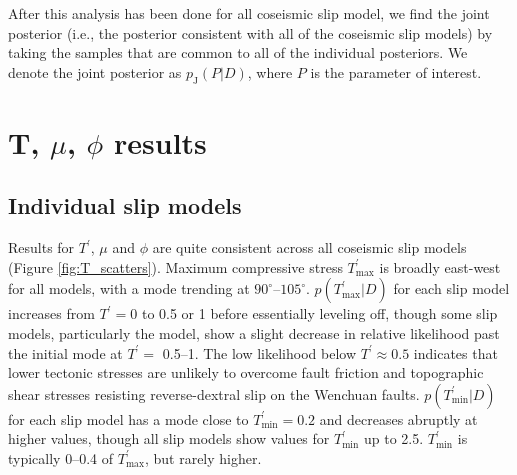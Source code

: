 \documentclass[twocolumn,jgrga]{AGUTeX}
\begin{document}
\begin{article}
After this analysis has been done for all coseismic slip model, we find
the joint posterior (i.e., the posterior consistent with all of the
coseismic slip models) by taking the samples that are common to all of
the individual posteriors. We denote the joint posterior as
$p_{\mathrm{J}}(P | D)$, where $P$ is the parameter of interest.

\section{T, $\mu$, $\phi$ results}\label{t-mu-phi-results}

\subsection{Individual slip models}\label{individual-slip-models}

Results for $T^\prime$, $\mu$ and $\phi$ are quite consistent across all
coseismic slip models (Figure \ref{fig:T_scatters}). Maximum compressive
stress $T^\prime_{\mathrm{max}}$ is broadly east-west for all models,
with a mode trending at $90^{\circ}$--$105^{\circ}$.
$p(T^\prime_{\mathrm{max}}|D)$ for each slip model increases from
$T^\prime = 0$ to 0.5 or 1 before essentially leveling off, though some
slip models, particularly the \citet{qi2011} model, show a
slight decrease in relative likelihood past the initial mode at
$T^\prime =$ 0.5--1.
The low likelihood below $T^\prime \approx 0.5$ indicates that lower
tectonic stresses are unlikely to overcome fault friction and
topographic shear stresses resisting reverse-dextral slip on the
Wenchuan faults. $p(T^\prime_{\mathrm{min}} | D)$ for each slip model
has a mode close to $T^\prime_{\mathrm{min}} = 0.2 $ and decreases
abruptly at higher values, though all slip models show values for
$T^\prime_{\mathrm{min}}$ up to 2.5. $T^\prime_{\mathrm{min}}$ is
typically 0--0.4 of $T^\prime_{\mathrm{max}}$, but rarely higher.


\end{article}
\end{document}

